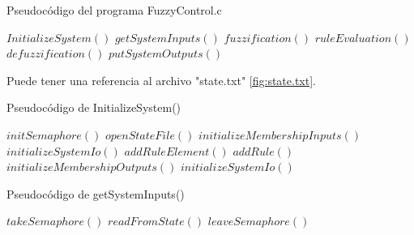 \begin{algorithm}[H]
\caption{Pseudocódigo del programa FuzzyControl.c}\label{alg:cap}
\begin{algorithmic}
\Begin
\State $InitializeSystem()$
    \State $getSystemInputs()$
    \State $fuzzification()$
    \State $ruleEvaluation()$
    \State $defuzzification()$
    \State $putSystemOutputs()$
\EndWhile
\End
\end{algorithmic}
\end{algorithm}

Puede tener una referencia al archivo "state.txt" \ref{fig:state.txt}. 

\begin{algorithm}[H]
\caption{Pseudocódigo de InitializeSystem()}\label{alg:cap}
\begin{algorithmic}
  \State $initSemaphore()$ 
  \State $openStateFile()$ 
            \State $initializeMembershipInputs()$ 
        \EndFor
        \State $initializeSystemIo()$ 
    \EndFor
    \bigbreak
            \State $addRuleElement()$ 
        \EndFor
        \State $addRule()$ 
    \EndFor
    \bigbreak
            \State $initializeMembershipOutputs()$ 
        \EndFor
        \State $initializeSystemIo()$ 
    \EndFor
\EndProcedure
\end{algorithmic}
\end{algorithm}

\begin{algorithm}[H]
\caption{Pseudocódigo de getSystemInputs()}
\begin{algorithmic}
  \State $takeSemaphore()$ 
  \State $readFromState()$ 
  \State $leaveSemaphore()$ 
\EndProcedure
\end{algorithmic}
\end{algorithm}

